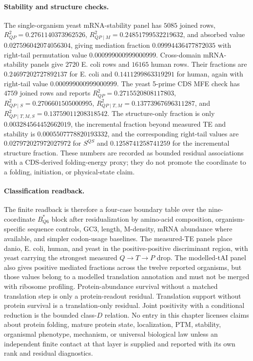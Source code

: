 \paragraph{Stability and structure checks.}
The single-organism yeast mRNA-stability panel has $5085$ joined rows, $R^{2}_{QP}=0.2761140373962526$, $R^{2}_{QP\mid M}=0.24851799532219632$, and absorbed value $0.027596042074056304$, giving mediation fraction $0.09994436477872035$ with right-tail permutation value $0.000999000999000999$.  Cross-domain mRNA-stability panels give $2720$ E. coli rows and $16165$ human rows.  Their fractions are $0.24697202727892137$ for E. coli and $0.1411299863319291$ for human, again with right-tail value $0.000999000999000999$.  The yeast 5-prime CDS MFE check has $4759$ joined rows and reports $R^{2}_{QP}=0.2715520808117803$, $R^{2}_{QP\mid S}=0.2706601505000995$, $R^{2}_{QP\mid T,M}=0.13773967696311287$, and $R^{2}_{QP\mid T,M,S}=0.13759011208318542$.  The structure-only fraction is only $0.003284564452662019$, the incremental fraction beyond measured TE and stability is $0.0005507778820193332$, and the corresponding right-tail values are $0.027972027972027972$ for $S^{Q\!S}$ and $0.1258741258741259$ for the incremental structure fraction.  These numbers are recorded as bounded residual associations with a CDS-derived folding-energy proxy; they do not promote the coordinate to a folding, initiation, or physical-state claim.

\paragraph{Classification readback.}
The finite readback is therefore a four-case boundary table over the nine-coordinate $B^{*}_{Q6}$ block after residualization by amino-acid composition, organism-specific sequence controls, GC3, length, M-density, mRNA abundance where available, and simpler codon-usage baselines.  The measured-TE panels place danio, E. coli, human, and yeast in the positive-positive discriminant region, with yeast carrying the strongest measured $Q \to T \to P$ drop.  The modelled-tAI panel also gives positive mediated fractions across the twelve reported organisms, but those values belong to a modelled translation annotation and must not be merged with ribosome profiling.  Protein-abundance survival without a matched translation step is only a protein-readout residual.  Translation support without protein survival is a translation-only residual.  Joint positivity with a conditional reduction is the bounded class-$D$ relation.  No entry in this chapter licenses claims about protein folding, mature protein state, localization, PTM, stability, organismal phenotype, mechanism, or universal biological law unless an independent finite contact at that layer is supplied and reported with its own rank and residual diagnostics.

